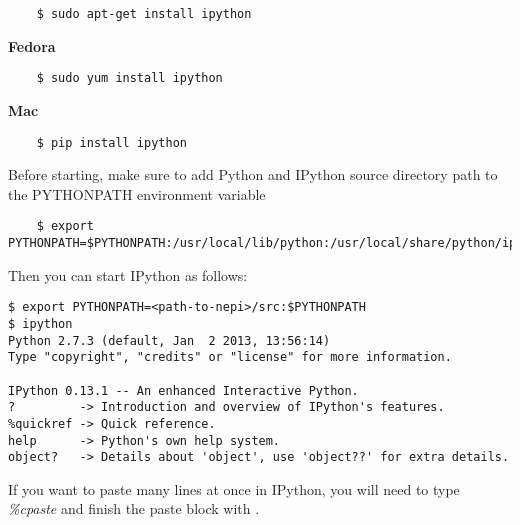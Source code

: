 \begingroup
    \fontsize{10pt}{12pt}\selectfont

\begin{verbatim}
    $ sudo apt-get install ipython
\end{verbatim}

\endgroup

\textbf{Fedora}\\

\begingroup
    \fontsize{10pt}{12pt}\selectfont

\begin{verbatim}
    $ sudo yum install ipython
\end{verbatim}

\endgroup

\textbf{Mac}\\

\begingroup
    \fontsize{10pt}{12pt}\selectfont

\begin{verbatim}
    $ pip install ipython
\end{verbatim}

\endgroup

Before starting, make sure to add Python and IPython source directory 
path to the PYTHONPATH environment variable

\begingroup
    \fontsize{10pt}{12pt}\selectfont

\begin{verbatim}
    $ export PYTHONPATH=$PYTHONPATH:/usr/local/lib/python:/usr/local/share/python/ipython
\end{verbatim}

\endgroup

Then you can start IPython as follows: 

\begin{verbatim}
$ export PYTHONPATH=<path-to-nepi>/src:$PYTHONPATH
$ ipython
Python 2.7.3 (default, Jan  2 2013, 13:56:14) 
Type "copyright", "credits" or "license" for more information.

IPython 0.13.1 -- An enhanced Interactive Python.
?         -> Introduction and overview of IPython's features.
%quickref -> Quick reference.
help      -> Python's own help system.
object?   -> Details about 'object', use 'object??' for extra details.

\end{verbatim}

If you want to paste many lines at once in IPython, you will need 
to type \emph{\%cpaste} and finish the paste block with \emph{\-\-}.

